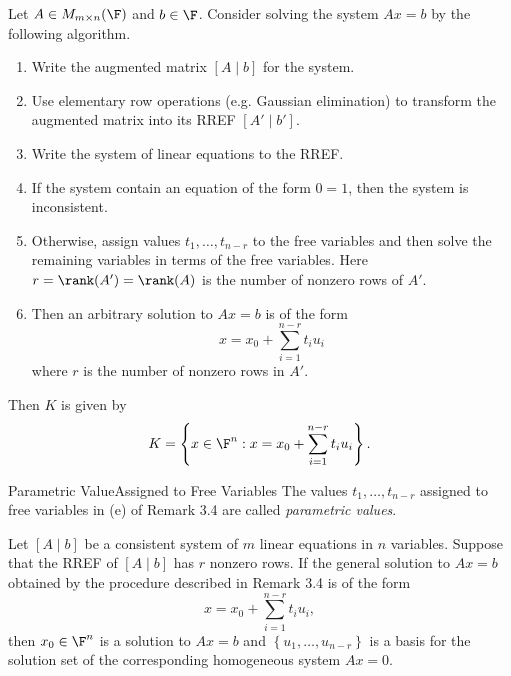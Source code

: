 \documentclass[linearalgebraI]{subfiles}
\begin{document}
    \begin{remark}
        Let $A\in M_{m\times n}(\F)$ and $b\in \F$. Consider solving the system $Ax=b$ by the following algorithm.
        \begin{enumerate}
            \item Write the augmented matrix $[A\mid b]$ for the system.
            \item Use elementary row operations (e.g. Gaussian elimination) to transform the augmented matrix into its RREF $[A'\mid b']$.
            \item Write the system of linear equations to the RREF.
            \item If the system contain an equation of the form $0=1$, then the system is inconsistent.
            \item Otherwise, assign values $t_1, \ldots, t_{n-r}$ to the free variables and then solve the remaining variables in terms of the free variables. Here $r = \rank(A') = \rank(A)$ is the number of nonzero rows of $A'$.
            \item Then an arbitrary solution to $Ax=b$ is of the form
                \begin{equation*}
                    x = x_0 + \sum^{n-r}_{i=1} t_iu_i
                \end{equation*}
                where $r$ is the number of nonzero rows in $A'$.
        \end{enumerate}
        Then $K$ is given by
        \begin{equation*}
            K = \left\lbrace x\in \F^n: x = x_0 + \sum^{n-r}_{i=1} t_iu_i \right\rbrace. 
        \end{equation*}
    \end{remark}

    \begin{definition}{Parametric Value}{Assigned to Free Variables}
        The values $t_1, \ldots, t_{n-r}$ assigned to free variables in (e) of Remark 3.4 are called \emph{parametric values}.
    \end{definition}

    \begin{prop}{}
        Let $[A\mid b]$ be a consistent system of $m$ linear equations in $n$ variables. Suppose that the RREF of $[A\mid b]$ has $r$ nonzero rows. If the general solution to $Ax=b$ obtained by the procedure described in Remark 3.4 is of the form
        \begin{equation*}
            x = x_0 + \sum^{n-r}_{i=1} t_iu_i,
        \end{equation*}
        then $x_0\in \F^n$ is a solution to $Ax=b$ and $\left\lbrace u_1, \ldots, u_{n-r} \right\rbrace$ is a basis for the solution set of the corresponding homogeneous system $Ax = 0$.
    \end{prop}
\end{document}
